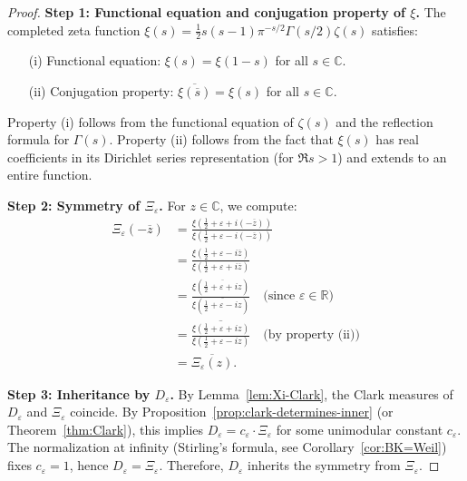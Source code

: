 ﻿\documentclass[12pt,a4paper]{article}
\theoremstyle{definition}
\theoremstyle{remark}
\newcommand{\CC}{\mathbb{C}}
\newcommand{\RR}{\mathbb{R}}
\begin{document}
\begin{proof}
\textbf{Step 1: Functional equation and conjugation property of $\xi$.}
The completed zeta function $\xi(s) = \frac{1}{2}s(s-1)\pi^{-s/2}\Gamma(s/2)\zeta(s)$ satisfies:
\begin{enumerate}
\item[(i)] Functional equation: $\xi(s) = \xi(1-s)$ for all $s \in \CC$.
\item[(ii)] Conjugation property: $\overline{\xi(\overline{s})} = \xi(s)$ for all $s \in \CC$.
\end{enumerate}
Property (i) follows from the functional equation of $\zeta(s)$ and the reflection formula for $\Gamma(s)$. Property (ii) follows from the fact that $\xi(s)$ has real coefficients in its Dirichlet series representation (for $\Re s > 1$) and extends to an entire function.

\textbf{Step 2: Symmetry of $\Xi_\varepsilon$.}
For $z \in \CC$, we compute:
\begin{align*}
  \Xi_\varepsilon(-\overline{z}) &= \frac{\xi(\tfrac12+\varepsilon+i(-\overline{z}))}{\xi(\tfrac12+\varepsilon-i(-\overline{z}))} \\
  &= \frac{\xi(\tfrac12+\varepsilon-i\overline{z})}{\xi(\tfrac12+\varepsilon+i\overline{z})} \\
  &= \frac{\xi(\overline{\tfrac12+\varepsilon+iz})}{\xi(\overline{\tfrac12+\varepsilon-iz})} \quad \text{(since $\varepsilon \in \RR$)} \\
  &= \overline{\frac{\xi(\tfrac12+\varepsilon+iz)}{\xi(\tfrac12+\varepsilon-iz)}} \quad \text{(by property (ii))} \\
  &= \overline{\Xi_\varepsilon(z)}.
\end{align*}

\textbf{Step 3: Inheritance by $D_\varepsilon$.}
By Lemma~\ref{lem:Xi-Clark}, the Clark measures of $D_\varepsilon$ and $\Xi_\varepsilon$ coincide. By Proposition~\ref{prop:clark-determines-inner} (or Theorem~\ref{thm:Clark}), this implies $D_\varepsilon = c_\varepsilon \cdot \Xi_\varepsilon$ for some unimodular constant $c_\varepsilon$. The normalization at infinity (Stirling's formula, see Corollary~\ref{cor:BK=Weil}) fixes $c_\varepsilon = 1$, hence $D_\varepsilon = \Xi_\varepsilon$. Therefore, $D_\varepsilon$ inherits the symmetry from $\Xi_\varepsilon$.
\end{proof}
\end{document}
